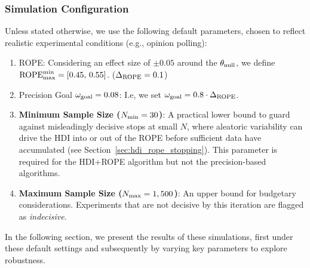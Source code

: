 \subsubsection*{Simulation Configuration}

Unless stated otherwise, we use the following default parameters, chosen to reflect realistic experimental conditions (e.g., opinion polling):

\begin{enumerate}[label=(\alph*)]
    \item ROPE: Considering an effect size of $\pm 0.05$ around the $\theta_{\rm null}$, we define $\mathrm{ROPE}_{\rm max}^{\rm min}=[0.45,\,0.55]$. ($\Delta_{\rm ROPE}=0.1$)
    \item Precision Goal $\omega_{\rm goal}=0.08$: I.e, we set $\omega_{\rm goal} = 0.8 \cdot \Delta_{\rm ROPE}$.
    \item \textbf{Minimum Sample Size ($N_{\rm min}=30$)}: A practical lower bound to guard against misleadingly decisive stops at small $N$, where aleatoric variability can drive the HDI into or out of the ROPE before sufficient data have accumulated (see Section~\ref{sec:hdi_rope_stopping}).
    This parameter is required for the HDI+ROPE algorithm but not the precision-based algorithms.
    \item \textbf{Maximum Sample Size ($N_{\rm max}=1,500$)}: An upper bound for budgetary considerations. Experiments that are not decisive by this iteration are flagged as \textit{indecisive}.
\end{enumerate}

In the following section, we present the results of these simulations, first under these default settings and subsequently by varying key parameters to explore robustness.